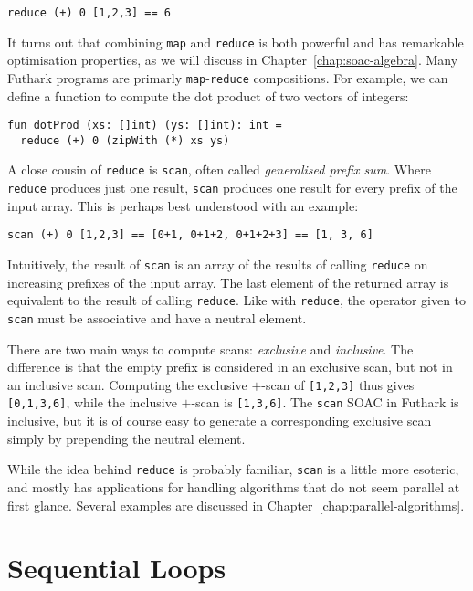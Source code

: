 \documentclass[oneside,11pt]{book}
\begin{document}
\begin{lstlisting}
reduce (+) 0 [1,2,3] == 6
\end{lstlisting}

It turns out that combining \texttt{map} and \texttt{reduce} is both
powerful and has remarkable optimisation properties, as we will
discuss in Chapter~\ref{chap:soac-algebra}.  Many Futhark programs are
primarly \texttt{map}-\texttt{reduce} compositions.  For example, we
can define a function to compute the dot product of two vectors of
integers:

\begin{lstlisting}
fun dotProd (xs: []int) (ys: []int): int =
  reduce (+) 0 (zipWith (*) xs ys)
\end{lstlisting}

A close cousin of \texttt{reduce} is \texttt{scan}, often called
\textit{generalised prefix sum}.  Where \texttt{reduce} produces just
one result, \texttt{scan} produces one result for every prefix of the
input array.  This is perhaps best understood with an example:

\begin{lstlisting}
scan (+) 0 [1,2,3] == [0+1, 0+1+2, 0+1+2+3] == [1, 3, 6]
\end{lstlisting}

Intuitively, the result of \texttt{scan} is an array of the results of calling
\texttt{reduce} on increasing prefixes of the input array.  The last
element of the returned array is equivalent to the result of calling
\texttt{reduce}. Like with \texttt{reduce}, the operator given to
\texttt{scan} must be associative and have a neutral element.

There are two main ways to compute scans: \textit{exclusive} and
\textit{inclusive}.  The difference is that the empty prefix is
considered in an exclusive scan, but not in an inclusive scan.
Computing the exclusive $+$-scan of \texttt{[1,2,3]} thus gives
\texttt{[0,1,3,6]}, while the inclusive $+$-scan is \texttt{[1,3,6]}.
The \texttt{scan} SOAC in Futhark is inclusive, but it is of course
easy to generate a corresponding exclusive scan simply by prepending
the neutral element.

While the idea behind \texttt{reduce} is probably familiar,
\texttt{scan} is a little more esoteric, and mostly has applications
for handling algorithms that do not seem parallel at first glance.
Several examples are discussed in
Chapter~\ref{chap:parallel-algorithms}.

\section{Sequential Loops}
\label{sec:sequential-loops}
\end{document}
